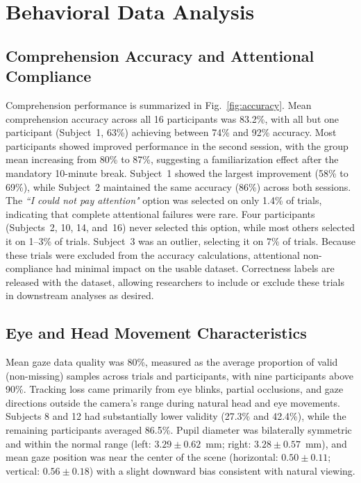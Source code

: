 \documentclass[journal]{IEEEtran}
\begin{document}
\section{Behavioral Data Analysis} \label{sec:behavioral}

\subsection{Comprehension Accuracy and Attentional Compliance}

Comprehension performance is summarized in Fig.~\ref{fig:accuracy}. Mean comprehension accuracy across all 16 participants was 83.2\%, with all but one participant (Subject~1, 63\%) achieving between 74\% and 92\% accuracy. Most participants showed improved performance in the second session, with the group mean increasing from 80\% to 87\%, suggesting a familiarization effect after the mandatory 10-minute break. Subject~1 showed the largest improvement (58\% to 69\%), while Subject~2 maintained the same accuracy (86\%) across both sessions.
%
The \textit{``I could not pay attention"} option was selected on only 1.4\% of trials, indicating that complete attentional failures were rare. Four participants (Subjects~2, 10, 14, and~16) never selected this option, while most others selected it on 1--3\% of trials. Subject~3 was an outlier, selecting it on 7\% of trials. Because these trials were excluded from the accuracy calculations, attentional non-compliance had minimal impact on the usable dataset. Correctness labels are released with the dataset, allowing researchers to include or exclude these trials in downstream analyses as desired.

\subsection{Eye and Head Movement Characteristics} \label{ssec:eye-head-char}

Mean gaze data quality was 80\%, measured as the average proportion of valid (non-missing) samples across trials and participants, with nine participants above 90\%. Tracking loss came primarily from eye blinks, partial occlusions, and gaze directions outside the camera's range during natural head and eye movements. Subjects 8 and 12 had substantially lower validity (27.3\% and 42.4\%), while the remaining participants averaged 86.5\%. Pupil diameter was bilaterally symmetric and within the normal range (left: $3.29 \pm 0.62$~mm; right: $3.28 \pm 0.57$~mm), and mean gaze position was near the center of the scene (horizontal: $0.50 \pm 0.11$; vertical: $0.56 \pm 0.18$) with a slight downward bias consistent with natural viewing.
\end{document}
